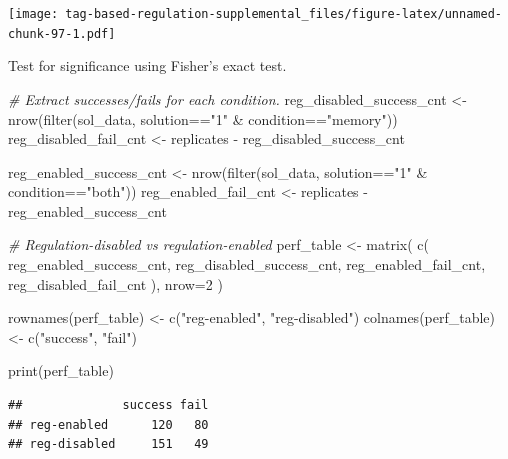 \documentclass[
]{book}
\newenvironment{Shaded}{\begin{snugshade}}{\end{snugshade}}
\newcommand{\AttributeTok}[1]{\textcolor[rgb]{0.77,0.63,0.00}{#1}}
\newcommand{\CommentTok}[1]{\textcolor[rgb]{0.56,0.35,0.01}{\textit{#1}}}
\newcommand{\DecValTok}[1]{\textcolor[rgb]{0.00,0.00,0.81}{#1}}
\newcommand{\FunctionTok}[1]{\textcolor[rgb]{0.00,0.00,0.00}{#1}}
\newcommand{\NormalTok}[1]{#1}
\newcommand{\OtherTok}[1]{\textcolor[rgb]{0.56,0.35,0.01}{#1}}
\newcommand{\SpecialCharTok}[1]{\textcolor[rgb]{0.00,0.00,0.00}{#1}}
\newcommand{\StringTok}[1]{\textcolor[rgb]{0.31,0.60,0.02}{#1}}
\begin{document}
\texttt{[image: tag-based-regulation-supplemental\_files/figure-latex/unnamed-chunk-97-1.pdf]}

Test for significance using Fisher's exact test.

\begin{Shaded}
\begin{Highlighting}[]
\CommentTok{\# Extract successes/fails for each condition.}
\NormalTok{reg\_disabled\_success\_cnt }\OtherTok{\textless{}{-}} \FunctionTok{nrow}\NormalTok{(}\FunctionTok{filter}\NormalTok{(sol\_data, solution}\SpecialCharTok{==}\StringTok{"1"} \SpecialCharTok{\&}\NormalTok{ condition}\SpecialCharTok{==}\StringTok{"memory"}\NormalTok{))}
\NormalTok{reg\_disabled\_fail\_cnt }\OtherTok{\textless{}{-}}\NormalTok{ replicates }\SpecialCharTok{{-}}\NormalTok{ reg\_disabled\_success\_cnt}

\NormalTok{reg\_enabled\_success\_cnt }\OtherTok{\textless{}{-}} \FunctionTok{nrow}\NormalTok{(}\FunctionTok{filter}\NormalTok{(sol\_data, solution}\SpecialCharTok{==}\StringTok{"1"} \SpecialCharTok{\&}\NormalTok{ condition}\SpecialCharTok{==}\StringTok{"both"}\NormalTok{))}
\NormalTok{reg\_enabled\_fail\_cnt }\OtherTok{\textless{}{-}}\NormalTok{ replicates }\SpecialCharTok{{-}}\NormalTok{ reg\_enabled\_success\_cnt}

\CommentTok{\# Regulation{-}disabled vs regulation{-}enabled}
\NormalTok{perf\_table }\OtherTok{\textless{}{-}} \FunctionTok{matrix}\NormalTok{(}
  \FunctionTok{c}\NormalTok{(}
\NormalTok{    reg\_enabled\_success\_cnt,}
\NormalTok{    reg\_disabled\_success\_cnt,}
\NormalTok{    reg\_enabled\_fail\_cnt,}
\NormalTok{    reg\_disabled\_fail\_cnt}
\NormalTok{    ),}
    \AttributeTok{nrow=}\DecValTok{2}
\NormalTok{)}

\FunctionTok{rownames}\NormalTok{(perf\_table) }\OtherTok{\textless{}{-}} \FunctionTok{c}\NormalTok{(}\StringTok{"reg{-}enabled"}\NormalTok{, }\StringTok{"reg{-}disabled"}\NormalTok{)}
\FunctionTok{colnames}\NormalTok{(perf\_table) }\OtherTok{\textless{}{-}} \FunctionTok{c}\NormalTok{(}\StringTok{"success"}\NormalTok{, }\StringTok{"fail"}\NormalTok{)}

\FunctionTok{print}\NormalTok{(perf\_table)}
\end{Highlighting}
\end{Shaded}

\begin{verbatim}
##              success fail
## reg-enabled      120   80
## reg-disabled     151   49
\end{verbatim}
\end{document}

